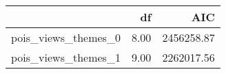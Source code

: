 \begin{table}[ht]
\centering
\begin{tabular}{rrr}
  \hline
 & df & AIC \\ 
  \hline
pois\_views\_themes\_0 & 8.00 & 2456258.87 \\ 
  pois\_views\_themes\_1 & 9.00 & 2262017.56 \\ 
   \hline
\end{tabular}
\end{table}
